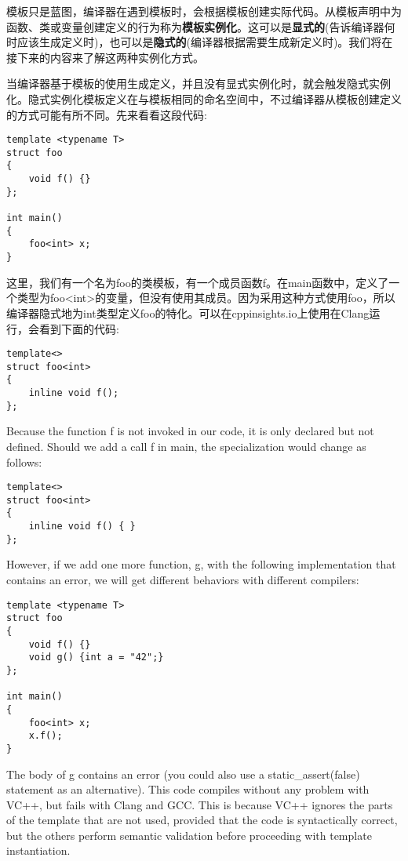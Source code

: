 
模板只是蓝图，编译器在遇到模板时，会根据模板创建实际代码。从模板声明中为函数、类或变量创建定义的行为称为\textbf{模板实例化}。这可以是\textbf{显式的}(告诉编译器何时应该生成定义时)，也可以是\textbf{隐式的}(编译器根据需要生成新定义时)。我们将在接下来的内容来了解这两种实例化方式。


当编译器基于模板的使用生成定义，并且没有显式实例化时，就会触发隐式实例化。隐式实例化模板定义在与模板相同的命名空间中，不过编译器从模板创建定义的方式可能有所不同。先来看看这段代码:

\begin{lstlisting}[style=styleCXX]
template <typename T>
struct foo
{
	void f() {}
};

int main()
{
	foo<int> x;
}
\end{lstlisting}

这里，我们有一个名为foo的类模板，有一个成员函数f。在main函数中，定义了一个类型为foo<int>的变量，但没有使用其成员。因为采用这种方式使用foo，所以编译器隐式地为int类型定义foo的特化。可以在cppinsights.io上使用在Clang运行，会看到下面的代码:

\begin{lstlisting}[style=styleCXX]
template<>
struct foo<int>
{
	inline void f();
};
\end{lstlisting}

Because the function f is not invoked in our code, it is only declared but not defined. Should we add a call f in main, the specialization would change as follows:

\begin{lstlisting}[style=styleCXX]
template<>
struct foo<int>
{
	inline void f() { }
};
\end{lstlisting}

However, if we add one more function, g, with the following implementation that contains an error, we will get different behaviors with different compilers:

\begin{lstlisting}[style=styleCXX]
template <typename T>
struct foo
{
	void f() {}
	void g() {int a = "42";}
};

int main()
{
	foo<int> x;
	x.f();
}
\end{lstlisting}

The body of g contains an error (you could also use a static\_assert(false) statement as an alternative). This code compiles without any problem with VC++, but fails with Clang and GCC. This is because VC++ ignores the parts of the template that are not used, provided that the code is syntactically correct, but the others perform semantic validation before proceeding with template instantiation.


